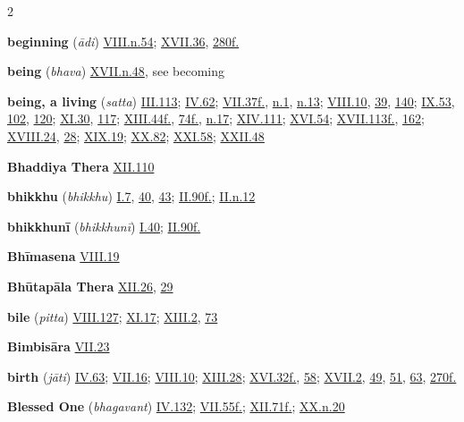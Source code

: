 \begin{multicols}{2}
\begin{vismHanging}
\par\textbf{beginning} (\emph{ādi}) \hyperlink{VIII.n54}{VIII.n.54}{}; \hyperlink{XVII.36}{XVII.36}{}, \hyperlink{XVII.280}{280f.}{}
\par\textbf{being} (\emph{bhava}) \hyperlink{XVII.n48}{XVII.n.48}{}, see becoming
\par\textbf{being, a living} (\emph{satta}) \hyperlink{III.113}{III.113}{}; \hyperlink{IV.62}{IV.62}{}; \hyperlink{VII.37}{VII.37f.}{}, \hyperlink{VII.n1}{n.1}{}, \hyperlink{VII.n13}{n.13}{}; \hyperlink{VIII.10}{VIII.10}{}, \hyperlink{VIII.39}{39}{}, \hyperlink{VIII.140}{140}{}; \hyperlink{IX.53}{IX.53}{}, \hyperlink{IX.102}{102}{}, \hyperlink{IX.120}{120}{}; \hyperlink{XI.30}{XI.30}{}, \hyperlink{XI.117}{117}{}; \hyperlink{XIII.44}{XIII.44f.}{}, \hyperlink{XIII.74}{74f.}{}, \hyperlink{XIII.n17}{n.17}{}; \hyperlink{XIV.111}{XIV.111}{}; \hyperlink{XVI.54}{XVI.54}{}; \hyperlink{XVII.113}{XVII.113f.}{}, \hyperlink{XVII.162}{162}{}; \hyperlink{XVIII.24}{XVIII.24}{}, \hyperlink{XVIII.28}{28}{}; \hyperlink{XIX.19}{XIX.19}{}; \hyperlink{XX.82}{XX.82}{}; \hyperlink{XXI.58}{XXI.58}{}; \hyperlink{XXII.48}{XXII.48}{}
\par\textbf{Bhaddiya Thera} \hyperlink{XII.110}{XII.110}{}
\par\textbf{bhikkhu} (\emph{bhikkhu}) \hyperlink{I.7}{I.7}{}, \hyperlink{I.40}{40}{}, \hyperlink{I.43}{43}{}; \hyperlink{II.90}{II.90f.}{}; \hyperlink{II.n12}{II.n.12}{}
\par\textbf{bhikkhunī} (\emph{bhikkhunī}) \hyperlink{I.40}{I.40}{}; \hyperlink{II.90}{II.90f.}{}
\par\textbf{Bhīmasena} \hyperlink{VIII.19}{VIII.19}{}
\par\textbf{Bhūtapāla Thera} \hyperlink{XII.26}{XII.26}{}, \hyperlink{XII.29}{29}{}
\par\textbf{bile} (\emph{pitta}) \hyperlink{VIII.127}{VIII.127}{}; \hyperlink{XI.17}{XI.17}{}; \hyperlink{XIII.2}{XIII.2}{}, \hyperlink{XIII.73}{73}{}
\par\textbf{Bimbisāra} \hyperlink{VII.23}{VII.23}{}
\par\textbf{birth} (\emph{jāti}) \hyperlink{IV.63}{IV.63}{}; \hyperlink{VII.16}{VII.16}{}; \hyperlink{VIII.10}{VIII.10}{}; \hyperlink{XIII.28}{XIII.28}{}; \hyperlink{XVI.32}{XVI.32f.}{}, \hyperlink{XVI.58}{58}{}; \hyperlink{XVII.2}{XVII.2}{}, \hyperlink{XVII.49}{49}{}, \hyperlink{XVII.51}{51}{}, \hyperlink{XVII.63}{63}{}, \hyperlink{XVII.270}{270f.}{}
\par\textbf{Blessed One} (\emph{bhagavant}) \hyperlink{IV.132}{IV.132}{}; \hyperlink{VII.55}{VII.55f.}{}; \hyperlink{XII.71}{XII.71f.}{}; \hyperlink{XX.n20}{XX.n.20}{}

\end{vismHanging}
\end{multicols}
